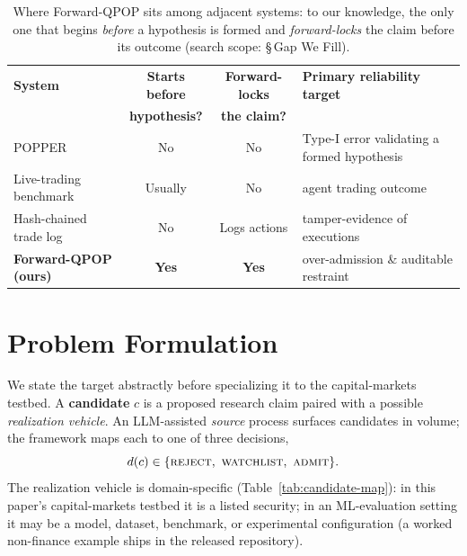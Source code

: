 \documentclass[11pt]{article}
\begin{document}
\begin{table}[h]
\centering
\footnotesize
\begin{tabularx}{\linewidth}{@{}lccL@{}}
\toprule
\textbf{System} & \textbf{Starts before} & \textbf{Forward-locks} & \textbf{Primary reliability target} \\
 & \textbf{hypothesis?} & \textbf{the claim?} & \\
\midrule
POPPER \citep{huang2025popper} & No & No & Type-I error validating a formed hypothesis \\
Live-trading benchmark \citep{qian2025whenagents,chen2025stockbench} & Usually & No & agent trading outcome \\
Hash-chained trade log \citep{45ck2025llmquant} & No & Logs actions & tamper-evidence of executions \\
\textbf{Forward-QPOP (ours)} & \textbf{Yes} & \textbf{Yes} & over-admission \& auditable restraint \\
\bottomrule
\end{tabularx}
\caption{Where Forward-QPOP sits among adjacent systems: to our knowledge, the only one that begins \emph{before} a hypothesis is formed and \emph{forward-locks} the claim before its outcome (search scope: \S\,Gap We Fill).}
\label{tab:popper-compare}
\end{table}

\section{Problem Formulation}
\label{sec:problem}

We state the target abstractly before specializing it to the capital-markets testbed. A
\textbf{candidate} $c$ is a proposed research claim paired with a possible \emph{realization
vehicle}. An LLM-assisted \emph{source} process surfaces candidates in volume; the framework
maps each to one of three decisions,
\[
  d(c)\in\{\textsc{reject},\ \textsc{watchlist},\ \textsc{admit}\}.
\]
The realization vehicle is domain-specific (Table~\ref{tab:candidate-map}): in this paper's
capital-markets testbed it is a listed security; in an ML-evaluation setting it may be a model,
dataset, benchmark, or experimental configuration (a worked non-finance example ships in the
released repository).
\end{document}
